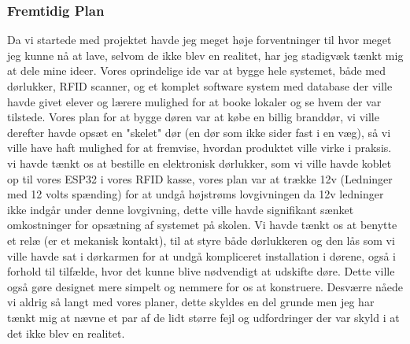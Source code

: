     \subsubsection{Fremtidig Plan}
    Da vi startede med projektet havde jeg meget høje forventninger til hvor meget jeg kunne nå at lave, selvom de ikke blev en realitet,
    har jeg stadigvæk tænkt mig at dele mine ideer. 
    \newline
    \newline
    Vores oprindelige ide var at bygge hele systemet, både med dørlukker, RFID scanner, og et komplet software system med database der ville havde givet elever og lærere
    mulighed for at booke lokaler og se hvem der var tilstede. Vores plan for at bygge døren var at købe en billig branddør,
    vi ville derefter havde opsæt en "skelet" dør (en dør som ikke sider fast i en væg), så vi ville have haft mulighed for at fremvise, hvordan produktet ville virke i praksis.
    vi havde tænkt os at bestille en elektronisk dørlukker, som vi ville havde koblet op til vores ESP32 i vores RFID kasse,
    vores plan var at trække 12v (Ledninger med 12 volts spænding) for at undgå højstrøms lovgivningen da 12v ledninger ikke indgår under denne lovgivning,
    dette ville havde signifikant sænket omkostninger for opsætning af systemet på skolen. Vi havde tænkt os at benytte et relæ (er et mekanisk kontakt),
    til at styre både dørlukkeren og den lås som vi ville havde sat i dørkarmen for at undgå kompliceret installation i dørene,
    også i forhold til tilfælde, hvor det kunne blive nødvendigt at udskifte døre. Dette ville også gøre designet mere simpelt og nemmere
    for os at konstruere. Desværre nåede vi aldrig så langt med vores planer, dette skyldes en del grunde men jeg har tænkt mig at nævne
    et par af de lidt større fejl og udfordringer der var skyld i at det ikke blev en realitet.
